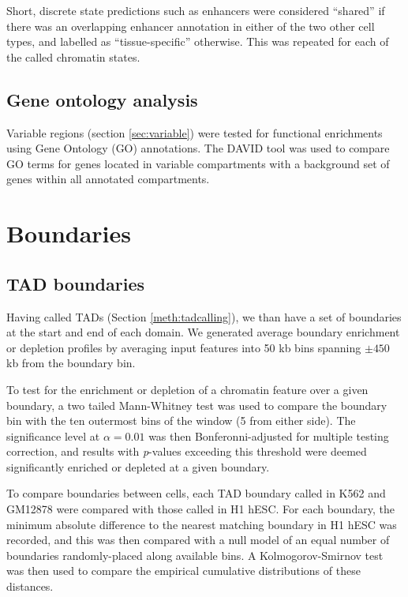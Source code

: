 \documentclass[a4paper,11pt,oneside]{book}
\begin{document}
Short, discrete state predictions such as enhancers were
considered ``shared'' if there was an overlapping enhancer annotation in
either of the two other cell types, and labelled as ``tissue-specific''
otherwise. This was repeated for each of the called chromatin states.

\subsection{Gene ontology analysis}

Variable regions (section \ref{sec:variable}) were tested for functional enrichments using Gene Ontology (GO) annotations.\cite{Ashburner2000} The DAVID tool\cite{Huang2008} was used to compare GO terms for genes located in variable compartments with a background set of genes within all annotated compartments.


\section{Boundaries}\label{boundaries}

\subsection{TAD boundaries}\label{meth:tadbounds}

Having called TADs (Section \ref{meth:tadcalling}), we than have a set of boundaries at the start and end of each domain. We generated average boundary enrichment or depletion profiles by averaging input features into 50 kb bins spanning $\pm450$ kb from the boundary bin.

To test for the enrichment or depletion of a chromatin feature over a
given boundary, a two tailed Mann-Whitney test was used to compare the
boundary bin with the ten outermost bins of the window (5 from either
side). The significance level at $\alpha = 0.01$ was then
Bonferonni-adjusted for multiple testing correction, and results with
\emph{p}-values exceeding this threshold were deemed significantly
enriched or depleted at a given boundary.

To compare boundaries between cells, each TAD boundary called in K562 and GM12878 were compared with those called in H1 hESC. For each boundary, the minimum absolute difference to the nearest matching boundary in H1 hESC was recorded, and this was then compared with a null model of an equal number of boundaries randomly-placed along available bins. A Kolmogorov-Smirnov test was then used to compare the empirical cumulative distributions of these distances.
\end{document}
